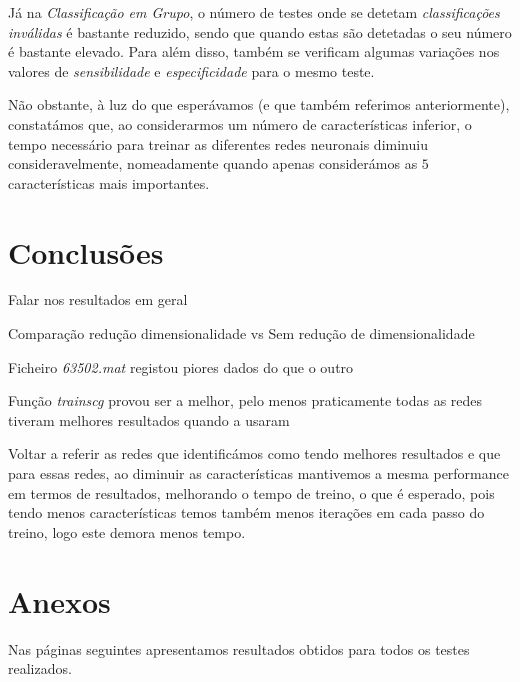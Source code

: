 \documentclass{article}
\begin{document}
Já na \emph{Classificação em Grupo}, o número de testes onde se detetam \emph{classificações inválidas} é bastante reduzido, sendo que quando estas são detetadas o seu número é bastante elevado. Para além disso, também se verificam algumas variações nos valores de \emph{sensibilidade} e \emph{especificidade} para o mesmo teste.

Não obstante, à luz do que esperávamos (e que também referimos anteriormente), constatámos que, ao considerarmos um número de características inferior, o tempo necessário para treinar as diferentes redes neuronais diminuiu consideravelmente, nomeadamente quando apenas considerámos as $5$ características mais importantes.

\pagebreak

\section{Conclusões}

Falar nos resultados em geral

Comparação redução dimensionalidade vs Sem redução de dimensionalidade

Ficheiro \emph{63502.mat} registou piores dados do que o outro

Função \emph{trainscg} provou ser a melhor, pelo menos praticamente todas as redes tiveram melhores resultados quando a usaram

Voltar a referir as redes que identificámos como tendo melhores resultados e que para essas redes, ao diminuir as características mantivemos a mesma performance em termos de resultados, melhorando o tempo de treino, o que é esperado, pois tendo menos características temos também menos iterações em cada passo do treino, logo este demora menos tempo.

\pagebreak

\section{Anexos}

Nas páginas seguintes apresentamos resultados obtidos para todos os testes realizados.


\end{document}
